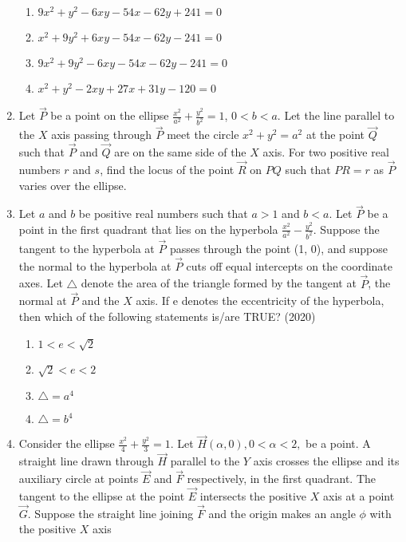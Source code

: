 \begin{enumerate}[label=\thesubsection.\arabic*.,ref=\thesubsection.\theenumi]
	\begin{multicols}{2}
\begin{enumerate}
     \item $9x^2+y^2-6xy-54x-62y+241=0$
     \item $x^2+9y^2+6xy-54x-62y-241=0$
     \item $9x^2+9y^2-6xy-54x-62y-241=0$
     \item $x^2+y^2-2xy+27x+31y-120=0$
\end{enumerate}\end{multicols}
\item Let $\vec{P}$ be a point on the ellipse $\frac{x^2}{a^2}+\frac{y^2}{b^2}=1$, $0<b<a$. Let the line parallel to the $X$ axis passing through $\vec{P}$ meet the circle $x^2+y^2=a^2$ at the point $\vec{Q}$ such that $\vec{P}$ and $\vec{Q}$ are on the same side of the $X$ axis. For two positive real numbers $r$ and $s$, find the locus of the point $\vec{R}$ on $PQ$ such that $PR
= r$ as $\vec{P}$ varies over the ellipse. \hfill{}
 \item Let $a$ and $b$ be positive real numbers such that $a > 1$ and $b < a$. Let $\vec{P}$ be a point in the first quadrant that lies on the hyperbola $\frac{x^2}{a^2} - \frac{y^2}{b^2}$. Suppose the tangent to the hyperbola at $\vec{P}$ passes through the point (1, 0), and suppose the normal to the hyperbola at $\vec{P}$ cuts off equal intercepts on the coordinate axes. Let $\triangle$ denote the area of the triangle formed by the tangent at $\vec{P}$, the normal at $\vec{P}$ and the $X$ axis. If e denotes the eccentricity of the hyperbola, then which of the following statements is/are TRUE?
\hfill (2020)
\begin{enumerate}	
 \item $1< e <\sqrt{2}$
 \item $\sqrt{2}< e <2$
 \item $\triangle = a^4$
 \item $\triangle = b^4$
\end{enumerate}	
 \item Consider the ellipse $\frac{x^2}{4}+\frac{y^2}{3}=1$. Let $\vec{H}(\alpha,0),0<\alpha<2,$ be a point. A straight line drawn through $\vec{H}$ parallel to the $Y$ axis crosses the ellipse and its auxiliary circle at points $\vec{E}$ and $\vec{F}$ respectively, in the first quadrant. The tangent to the ellipse at the point $\vec{E}$ intersects the positive $X$ axis at a point $\vec{G}$. Suppose the straight line joining $\vec{F}$ and the origin makes an angle $\phi$ with the positive $X$ axis

\end{enumerate}
